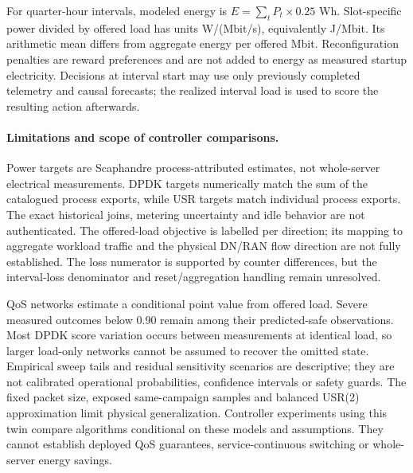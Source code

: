 For quarter-hour intervals, modeled energy is
$E=\sum_t P_t\times0.25$ Wh. Slot-specific power divided by offered load has
units W/(Mbit/s), equivalently J/Mbit. Its arithmetic mean differs from aggregate
energy per offered Mbit. Reconfiguration penalties are reward preferences and
are not added to energy as measured startup electricity. Decisions at interval
start may use only previously completed telemetry and causal forecasts; the
realized interval load is used to score the resulting action afterwards.

\paragraph{Limitations and scope of controller comparisons.}
Power targets are Scaphandre process-attributed estimates, not whole-server
electrical measurements. DPDK targets numerically match the sum of the catalogued
process exports, while USR targets match individual process exports. The exact
historical joins, metering uncertainty and idle behavior are not authenticated.
The offered-load objective is labelled per direction; its mapping to aggregate
workload traffic and the physical DN/RAN flow direction are not fully established.
The loss numerator is supported by counter differences, but the interval-loss
denominator and reset/aggregation handling remain unresolved.

QoS networks estimate a conditional point value from offered load. Severe
measured outcomes below 0.90 remain among their predicted-safe observations.
Most DPDK score variation occurs between measurements at identical load, so
larger load-only networks cannot be assumed to recover the omitted state.
Empirical sweep tails and residual sensitivity scenarios are descriptive; they
are not calibrated operational probabilities, confidence intervals or safety
guards. The fixed packet size, exposed same-campaign samples and balanced
USR(2) approximation limit physical generalization. Controller experiments using
this twin compare algorithms conditional on these models and assumptions. They
cannot establish deployed QoS guarantees, service-continuous switching or
whole-server energy savings.

